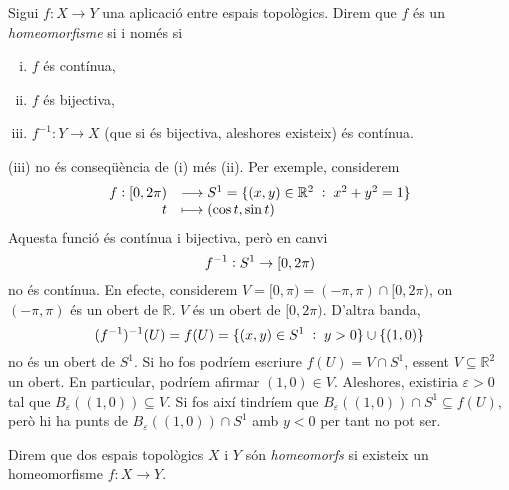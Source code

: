 \documentclass[../main.tex]{subfiles}
\begin{document}
\begin{defi}
[Homeomorfisme]\label{def:homeomorfisme} Sigui $f:X\rightarrow Y$ una aplicació entre espais topològics. Direm que $f$ és un \textit{homeomorfisme} si i només si
\begin{enumerate}[(i)]
    \item $f$ és contínua,
    \item $f$ és bijectiva,
    \item $f^{-1}:Y\rightarrow X$ (que si és bijectiva, aleshores existeix) és contínua.
\end{enumerate}
\end{defi}

\begin{nota}
\label{nota:3noconsequenciade1i2} (iii) no és conseqüència de (i) més (ii). Per exemple, considerem
\begin{equation}
    \notag
    \begin{array}{rl}
        f:[0,2\pi) & \longrightarrow S^1 = \{(x,y)\in\mathbb{R}^2\;:\;x^2+y^2=1\} \\
        t & \longmapsto (\cos t,\sin t)
    \end{array}
\end{equation}
Aquesta funció és contínua i bijectiva, però en canvi
\begin{equation}
    \notag
    f^{-1}:S^1\rightarrow [0,2\pi)
\end{equation}
no és contínua. En efecte, considerem $V = [0,\pi) = (-\pi,\pi)\cap[0,2\pi)$, on $(-\pi,\pi)$ és un obert de $\mathbb{R}$. $V$ és un obert de $[0,2\pi)$. D'altra banda,
\begin{equation}
    \notag
    (f^{-1})^{-1}(U) = f(U) = \{(x,y)\in S^1\;:\; y>0\}\cup\{(1,0)\}
\end{equation}
no és un obert de $S^1$. Si ho fos podríem escriure $f(U) = V\cap S^1$, essent $V\subseteq \mathbb{R}^2$ un obert. En particular, podríem afirmar $(1,0)\in V$. Aleshores, existiria $\varepsilon>0$ tal que $B_\varepsilon((1,0))\subseteq V$. Si fos així tindríem que $B_\varepsilon((1,0))\cap S^1\subseteq f(U)$, però hi ha punts de $B_\varepsilon((1,0))\cap S^1$ amb $y<0$ per tant no pot ser.
\end{nota}


\begin{defi}
\label{def:espaishomeomorfs} Direm que dos espais topològics $X$ i $Y$ són \textit{homeomorfs} si existeix un homeomorfisme $f:X\rightarrow Y$.
\end{defi}
\end{document}
